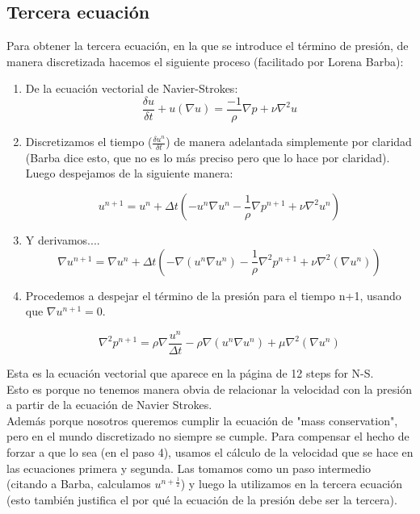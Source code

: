 \documentclass[a4paper]{article}
\begin{document}


\subsection{Tercera ecuación}

Para obtener la tercera ecuación, en la que se introduce el término de presión, de manera discretizada hacemos el siguiente proceso (facilitado por Lorena Barba):

\begin{enumerate}
\item De la ecuación vectorial de Navier-Strokes:
	$$ \frac{\delta u}{\delta t} + u(\nabla u) = \frac{-1}{\rho} \nabla p + \nu \nabla^{2}u$$

\item Discretizamos el tiempo ($\frac{\delta u^{n}}{\delta t}$) de manera adelantada simplemente por claridad (Barba dice esto, que no es lo más preciso pero que lo hace por claridad). Luego despejamos de la siguiente manera:

	$$u^{n+1} = u^{n} + \Delta t\left(-u^{n}\nabla u^{n} - \frac{1}{\rho}\nabla p^{n+1} + \nu\nabla^{2}u^{n}\right)$$ 

\item Y derivamos....
	$$\nabla u^{n+1} = \nabla u^{n} + \Delta t\left(-\nabla(u^{n}\nabla u^{n}) - \frac{1}{\rho}\nabla^{2} p^{n+1} + \nu\nabla^{2}(\nabla u^{n})\right)$$ 

\item Procedemos a despejar el término de la presión para el tiempo n+1, usando que $\nabla u^{n+1} = 0$.

	$$ \nabla^{2}p^{n+1} = \rho\nabla\frac{u^{n}}{\Delta t} - \rho\nabla\left(u^{n}\nabla u^{n}\right) + \mu\nabla^{2}\left(\nabla u^{n}\right)$$

\end{enumerate}

Esta es la ecuación vectorial que aparece en la página de 12 steps for N-S.\\
Esto es porque no tenemos manera obvia de relacionar la velocidad con la presión a partir de la ecuación de Navier Strokes.\\
Además porque nosotros queremos cumplir la ecuación de "mass conservation", pero en el mundo discretizado no siempre se cumple. Para compensar el hecho de forzar a que lo sea (en el paso 4), usamos el cálculo de la velocidad que se hace en las ecuaciones primera y segunda. Las tomamos como un paso intermedio (citando a Barba, calculamos $u^{n+\frac{1}{2}}$) y luego la utilizamos en la tercera ecuación (esto también justifica el por qué la ecuación de la presión debe ser la tercera).\\
\end{document}
